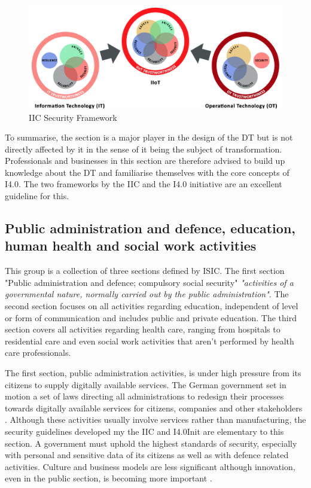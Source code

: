 \begin{figure}[H]
\centering
\includegraphics[width=1\columnwidth]{images/iic-iiot-trustworthiness}
\caption{\ac{IIC} Security Framework}
\end{figure}

To summarise, the section is a major player in the design of the \ac{DT} but is not directly affected by it in the sense of it being the subject of transformation. Professionals and businesses in this section are therefore advised to build up knowledge about the \ac{DT} and familiarise themselves with the core concepts of \ac{I4.0}. The two frameworks by the \ac{IIC} and the \ac{I4.0} initiative are an excellent guideline for this.

\subsection{Public administration and defence, education, human health and social work activities}

This group is a collection of  three  sections  defined  by \ac{ISIC}. The first section "Public administration and defence; compulsory social security" \emph{"activities of a governmental nature, normally carried out by the public administration"}\cite[p.243]{ISIC:2008}. The second section focuses on all activities regarding education, independent of level or form of communication and includes public and private education. The third section covers all activities regarding health care, ranging from hospitals to residential care and even social work activities that aren't performed by health care professionals\cite[p.254ff]{ISIC:2008}.

The first section, public administration activities, is under high pressure from its citizens to supply digitally available services. The German government set in motion a set of laws directing all administrations to redesign their processes towards digitally available services for citizens, companies and other stakeholders \cite{verwaltung:2014}. Although these activities usually involve services rather than manufacturing, the security guidelines developed my the \ac{IIC} and \ac{I4.0Init} are elementary to this section. A government must uphold the highest standards of security, especially with personal and sensitive data of its citizens as well as with defence related activities. Culture and business models are less significant although innovation, even in the public section, is becoming more important \cite{derivwhitehouse:2016}. 

